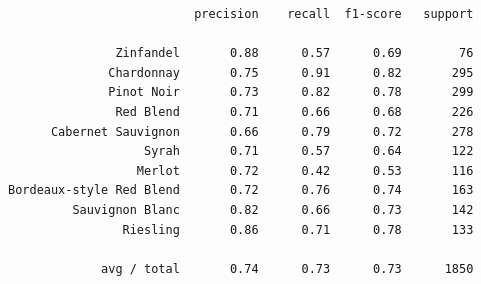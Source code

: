 \documentclass[11pt]{article} %
\begin{document}
\newpage
\begin{lstlisting}
                          precision    recall  f1-score   support

               Zinfandel       0.88      0.57      0.69        76
              Chardonnay       0.75      0.91      0.82       295
              Pinot Noir       0.73      0.82      0.78       299
               Red Blend       0.71      0.66      0.68       226
      Cabernet Sauvignon       0.66      0.79      0.72       278
                   Syrah       0.71      0.57      0.64       122
                  Merlot       0.72      0.42      0.53       116
Bordeaux-style Red Blend       0.72      0.76      0.74       163
         Sauvignon Blanc       0.82      0.66      0.73       142
                Riesling       0.86      0.71      0.78       133

             avg / total       0.74      0.73      0.73      1850
\end{lstlisting}
\newpage
\end{document}
